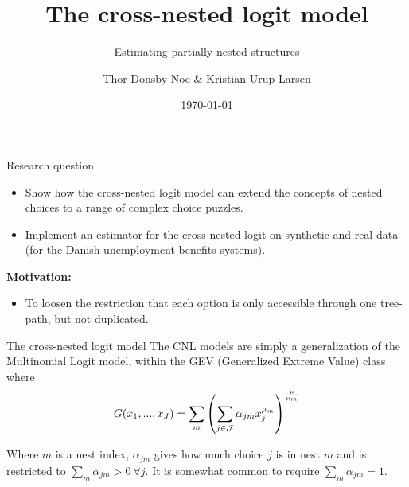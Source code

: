 \documentclass[10pt]{beamer}
\title{The cross-nested logit model}
\subtitle{Estimating partially nested structures}
\date{\today}
\author{Thor Donsby Noe \& Kristian Urup Larsen}
\institute{Department of Economics, University of Copenhagen}
\begin{document}
\maketitle


\begin{frame}{Research question}
  \begin{itemize}
    \item Show how the cross-nested logit model can extend the concepts of nested choices to a range of complex choice puzzles.
    \item Implement an estimator for the cross-nested logit on synthetic and real data (for the Danish unemployment benefits systems).
  \end{itemize}

  \begin{figure}[!h]
    \resizebox{3in}{!}{}
  \end{figure}

  \textbf{Motivation:}
  \begin{itemize}
    \item To loosen the restriction that each option is only accessible through one tree-path, but not duplicated.
  \end{itemize}
\end{frame}


\begin{frame}{The cross-nested logit model}
  The CNL models are simply a generalization of the Multinomial Logit model, within the GEV (Generalized Extreme Value) class where
  \begin{equation}
    \small
  G(x_1, ..., x_J) = \sum_{m} \left( \sum_{j\in\mathcal{J}} \alpha_{jm} x_j^{\mu_m} \right)^{\frac{\mu}{\mu_m}}
  \end{equation}

  Where $m$ is a nest index, $\alpha_{jm}$ gives how much choice $j$ is in nest $m$ and is restricted to $\sum_m \alpha_{jm}> 0 \ \forall j$. It is somewhat common to require $\sum_m \alpha_{jm} = 1$.

  \begin{figure}[!h]
    \resizebox{3in}{!}{}
  \end{figure}
\end{frame}
\end{document}
